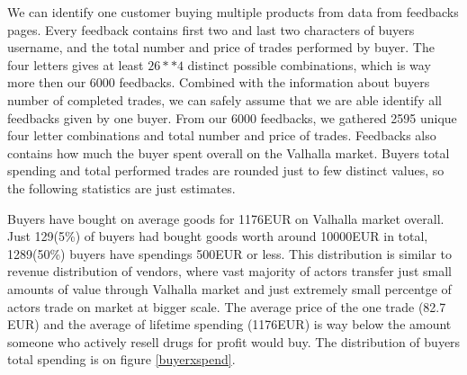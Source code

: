 \documentclass[
  digital, %
  table,   %
  lof,     %
  lot,     %
  oneside
]{fithesis3}
\begin{document}
We can identify one customer buying multiple products from data from feedbacks pages.
Every feedback contains first two and last two characters of buyers username,
and the total number and price of trades performed by buyer.
The four letters gives at least $26**4$ distinct possible combinations, which is way
more then our 6000 feedbacks. Combined with the information
about buyers number of completed trades, we can safely assume that we are able identify
all feedbacks given by one buyer.
From our 6000 feedbacks, we gathered 2595 unique four letter combinations
and total number and price of trades.
Feedbacks also contains how much the buyer spent overall on the Valhalla market.
Buyers total spending and total performed trades are rounded just to few distinct values, so the
following statistics are just estimates.

Buyers have bought on average goods for 1176EUR on Valhalla market overall.
Just 129(5\%) of buyers had bought goods worth around 10000EUR in total,
 1289(50\%) buyers have spendings 500EUR or less.
This distribution is similar to revenue distribution of vendors, where
vast majority of actors transfer just small amounts of value through Valhalla market and
just extremely small percentge of actors trade on market at bigger scale.
The average price of the one trade (82.7 EUR) and the average of lifetime spending (1176EUR)
is way below the amount someone who actively resell drugs for profit would buy.
The distribution of buyers total spending is on figure \ref{buyerxspend}.
\end{document}
